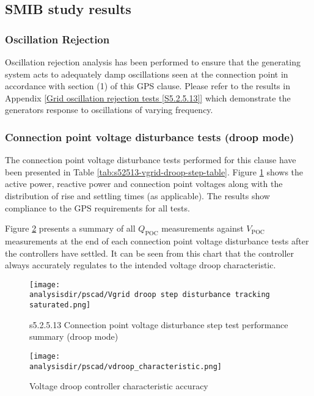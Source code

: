 \documentclass{../grid-link-report}
\newcommand{\analysisdir}{report-assets/analysis}
\begin{document}
	\subsection{SMIB study results}
	
	\subsubsection{Oscillation Rejection}
	Oscillation rejection analysis has been performed to ensure that the generating system acts to adequately damp oscillations seen at the connection point in accordance with section (1) of this GPS clause. Please refer to the results in Appendix \ref{Grid oscillation rejection tests [S5.2.5.13]} which demonstrate the generators response to oscillations of varying frequency.
	
	\subsubsection{Connection point voltage disturbance tests (droop mode)}
	\label{subsec:s52513-vgrid-steps-droop-mode}
	
	The connection point voltage disturbance tests performed for this clause have been presented in Table \ref{tab:s52513-vgrid-droop-step-table}. Figure \ref{fig:s52513-vgrid-droop-saturated-step-summary-plot} shows the active power, reactive power and connection point voltages along with the distribution of rise and settling times (as applicable). The results show compliance to the GPS requirements for all tests.
	
	Figure \ref{fig:s52513-vdroop-controller-accuracy} presents a summary of all $Q_{\mathrm{POC}}$ measurements against $V_{\mathrm{POC}}$ measurements at the end of each connection point voltage disturbance tests after the controllers have settled. It can be seen from this chart that the controller always accurately regulates to the intended voltage droop characteristic.
	
	
	\begin{figure}[H]
		\centering
		\texttt{[image: \\analysisdir/pscad/Vgrid droop step disturbance tracking saturated.png]}
		\caption{s5.2.5.13 Connection point voltage disturbance step test performance summary (droop mode)}
		\label{fig:s52513-vgrid-droop-saturated-step-summary-plot}
	\end{figure}
	
	\begin{figure}[H]
		\centering
		\texttt{[image: \\analysisdir/pscad/vdroop\_characteristic.png]}
		\caption{Voltage droop controller characteristic accuracy}
		\label{fig:s52513-vdroop-controller-accuracy}
	\end{figure}
	
\end{document}
